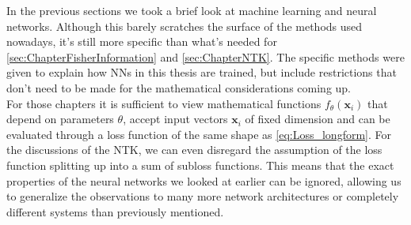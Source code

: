 In the previous sections we took a brief look at machine learning and neural networks. Although this barely scratches the surface of the methods used nowadays, it's still more specific than what's needed for \cref{sec:ChapterFisherInformation} and \cref{sec:ChapterNTK}. The specific methods were given to explain how NNs in this thesis are trained, but include restrictions that don't need to be made for the mathematical considerations coming up.\\
For those chapters it is sufficient to view mathematical functions $f_\theta(\mathbf{x}_i)$ that depend on parameters $\theta$, accept input vectors $\mathbf{x}_i$ of fixed dimension and can be evaluated through a loss function of the same shape as \cref{eq:Loss_longform}. For the discussions of the NTK, we can even disregard the assumption of the loss function splitting up into a sum of subloss functions. This means that the exact properties of the neural networks we looked at earlier can be ignored, allowing us to generalize the observations to many more network architectures or completely different systems than previously mentioned.